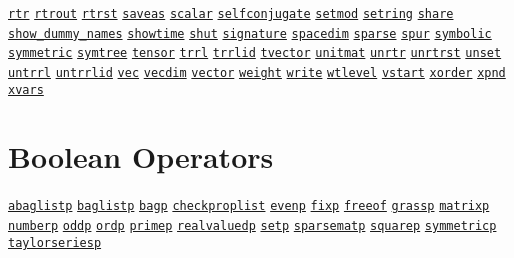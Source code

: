 \begin{list}{}
\hyperlink{command:RTR}{\texttt{rtr}}
\hyperlink{command:RTROUT}{\texttt{rtrout}}
\hyperlink{command:RTRST}{\texttt{rtrst}}
\hyperlink{command:SAVEAS}{\texttt{saveas}}
\hyperlink{command:SCALAR}{\texttt{scalar}}
\hyperlink{command:SELFCONJUGATE}{\texttt{selfconjugate}}
\hyperlink{command:SETMOD}{\texttt{setmod}}
\hyperlink{command:SETRING}{\texttt{setring}}
\hyperlink{command:SHARE}{\texttt{share}}
\hyperlink{command:SHOW_DUMMY_NAMES}{\texttt{show\_dummy\_names}}
\hyperlink{command:SHOWTIME}{\texttt{showtime}}
\hyperlink{command:SHUT}{\texttt{shut}}
\hyperlink{command:SIGNATURE}{\texttt{signature}}
\hyperlink{command:SPACEDIM}{\texttt{spacedim}}
\hyperlink{command:SPARSE}{\texttt{sparse}}
\hyperlink{command:SPUR}{\texttt{spur}}
\hyperlink{target:modes}{\texttt{symbolic}}
\hyperlink{reserved:SYMMETRIC}{\texttt{symmetric}}
\hyperlink{command:SYMTREE}{\texttt{symtree}}
\hyperlink{command:TENSOR}{\texttt{tensor}}
\hyperlink{command:TRRL}{\texttt{trrl}}
\hyperlink{command:TRRLID}{\texttt{trrlid}}
\hyperlink{command:TVECTOR}{\texttt{tvector}}
\hyperlink{command:UNITMAT}{\texttt{unitmat}}
\hyperlink{command:UNRTR}{\texttt{unrtr}}
\hyperlink{command:UNRTRST}{\texttt{unrtrst}}
\hyperlink{command:UNSET}{\texttt{unset}}
\hyperlink{command:UNTRRL}{\texttt{untrrl}}
\hyperlink{command:UNTRRLID}{\texttt{untrrlid}}
\hyperlink{command:VEC}{\texttt{vec}}
\hyperlink{command:VECDIM}{\texttt{vecdim}}
\hyperlink{command:VECTOR}{\texttt{vector}}
\hyperlink{command:WEIGHT}{\texttt{weight}}
\hyperlink{command:WRITE}{\texttt{write}}
\hyperlink{command:WTLEVEL}{\texttt{wtlevel}}
\hyperlink{command:VSTART}{\texttt{vstart}}
\hyperlink{command:XORDER}{\texttt{xorder}}
\hyperlink{command:XPND}{\texttt{xpnd}}
\hyperlink{command:XVARS}{\texttt{xvars}}
\halfinterwordspace

\section{Boolean Operators}

\doubleinterwordspace
\hyperlink{operator:ABAGLISTP}{\texttt{abaglistp}}
\hyperlink{operator:BAGLISTP}{\texttt{baglistp}}
\hyperlink{operator:BAGP}{\texttt{bagp}}
\hyperlink{operator:CHECKPROPLIST}{\texttt{checkproplist}}
\hyperlink{operator:EVENP}{\texttt{evenp}}
\hyperlink{operator:FIXP}{\texttt{fixp}}
\hyperlink{operator:FREEOF}{\texttt{freeof}}
\hyperlink{operator:GRASSP}{\texttt{grassp}}
\hyperlink{operator:MATRIXP}{\texttt{matrixp}}
\hyperlink{operator:NUMBERP}{\texttt{numberp}}
\hyperlink{operator:ODDP}{\texttt{oddp}}
\hyperlink{operator:ORDP}{\texttt{ordp}}
\hyperlink{operator:PRIMEP}{\texttt{primep}}
\hyperlink{operator:REALVALUEDP}{\texttt{realvaluedp}}
\hyperlink{operator:SETP}{\texttt{setp}}
\hyperlink{operator:SPARSEMATP}{\texttt{sparsematp}}
\hyperlink{operator:SQUAREP}{\texttt{squarep}}
\hyperlink{operator:SYMMETRICP}{\texttt{symmetricp}}
\hyperlink{operator:TAYLORSERIESP}{\texttt{taylorseriesp}}
\halfinterwordspace


\end{list}
